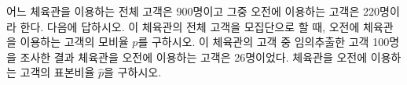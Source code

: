 어느 체육관을 이용하는 전체 고객은 900명이고 그중 오전에 이용하는 고객은 220명이라 한다. 다음에 답하시오.
 이 체육관의 전체 고객을 모집단으로 할 때, 오전에 체육관을 이용하는 고객의 모비율 $p$를 구하시오.
 이 체육관의 고객 중 임의추출한 고객 100명을 조사한 결과 체육관을 오전에 이용하는 고객은 26명이었다. 체육관을 오전에 이용하는 고객의 표본비율 $\hat{p}$을 구하시오.
